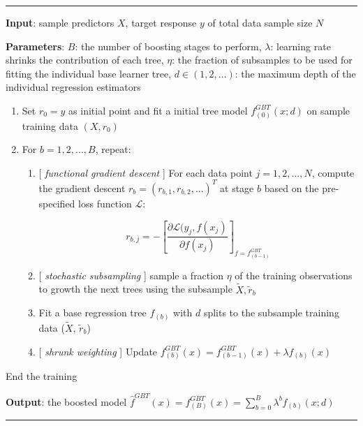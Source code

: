\documentclass[
]{book}
\begin{document}
\begin{center}\rule{0.5\linewidth}{0.5pt}\end{center}

\textbf{Input}: sample predictors \(X\), target response \(y\) of total data sample size \(N\)

\textbf{Parameters}: \(B\): the number of boosting stages to perform, \(\lambda\): learning rate shrinks the contribution of each tree, \(\eta\): the fraction of subsamples to be used for fitting the individual base learner tree, \(d \in (1,2,...)\): the maximum depth of the individual regression estimators

\begin{enumerate}
\def\labelenumi{\arabic{enumi}.}
\item
  Set \(r_0 = y\) as initial point and fit a initial tree model \(f^{GBT}_{(0)}(x; d)\) on sample training data \((X, r_0)\)
\item
  For \(b=1,2,... , B\), repeat:

  \begin{enumerate}
  \def\labelenumii{(\alph{enumii})}
  \item
    {[} {\emph{functional gradient descent}} {]} For each data point \(j=1,2,...,N\), compute the gradient descent \(r_b = (r_{b,1}, r_{b,2}, ...)^T\) at stage \(b\) based on the pre-specified loss function \(\mathcal{L}\):

    \[
    r_{b,j} =  - \left[ \frac{ \partial \mathcal{L}(y_j, f(x_j) }{\partial f(x_j)} \right]_{f= f^{GBT}_{(b-1)} }
    \]
  \item
    {[} {\emph{stochastic subsampling}} {]} sample a fraction \(\eta\) of the training observations to growth the next trees using the subsample \(\tilde{X}, \tilde{r}_{b}\)
  \item
    Fit a base regression tree \(f_{(b)}\) with \(d\) splits to the subsample training data (\(\tilde{X}\), \(\tilde{r}_{b}\))
  \item
    {[} {\emph{shrunk weighting}} {]} Update \(f^{GBT}_{(b)}(x) = f^{GBT}_{(b-1)}(x) + \lambda f_{(b)}(x)\)
  \end{enumerate}
\end{enumerate}

End the training

\textbf{Output}: the boosted model \(\hat{f}^{GBT}(x) = f^{GBT}_{(B)}(x) = \sum_{b=0}^B \lambda^b f_{(b)}(x; d)\)

\begin{center}\rule{0.5\linewidth}{0.5pt}\end{center}
\end{document}
